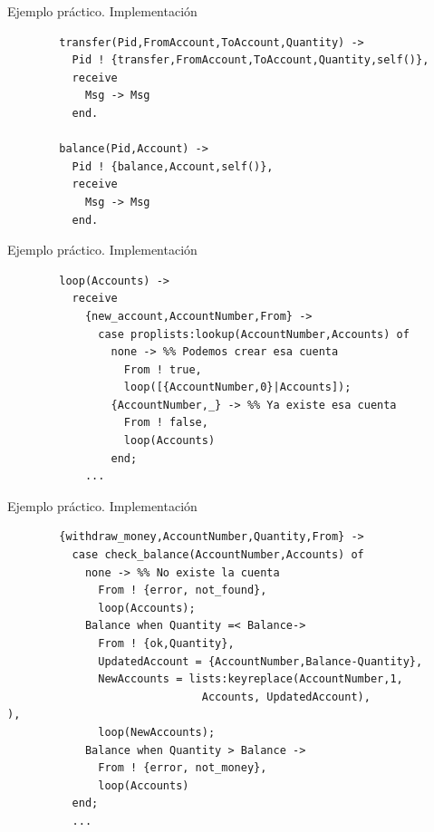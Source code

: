 \documentclass{beamer}
\begin{document}
    \begin{frame}[fragile]{Ejemplo práctico. Implementación}
      \begin{verbatim}
        transfer(Pid,FromAccount,ToAccount,Quantity) ->
          Pid ! {transfer,FromAccount,ToAccount,Quantity,self()},
          receive
            Msg -> Msg
          end.

        balance(Pid,Account) ->
          Pid ! {balance,Account,self()},
          receive
            Msg -> Msg
          end.
      \end{verbatim}
    \end{frame}

    \begin{frame}[fragile]{Ejemplo práctico. Implementación}
      \begin{verbatim}
        loop(Accounts) ->
          receive
            {new_account,AccountNumber,From} ->
              case proplists:lookup(AccountNumber,Accounts) of
                none -> %% Podemos crear esa cuenta
                  From ! true,
                  loop([{AccountNumber,0}|Accounts]);
                {AccountNumber,_} -> %% Ya existe esa cuenta
                  From ! false,
                  loop(Accounts)
                end;
            ...
      \end{verbatim}
    \end{frame}

    \begin{frame}[fragile]{Ejemplo práctico. Implementación}
      \begin{verbatim}
        {withdraw_money,AccountNumber,Quantity,From} ->
          case check_balance(AccountNumber,Accounts) of
            none -> %% No existe la cuenta
              From ! {error, not_found},
              loop(Accounts);
            Balance when Quantity =< Balance->
              From ! {ok,Quantity},
              UpdatedAccount = {AccountNumber,Balance-Quantity},
              NewAccounts = lists:keyreplace(AccountNumber,1,
                              Accounts, UpdatedAccount),                             ),
              loop(NewAccounts);
            Balance when Quantity > Balance ->
              From ! {error, not_money},
              loop(Accounts)
          end;
          ...
      \end{verbatim}
    \end{frame}
\end{document}

